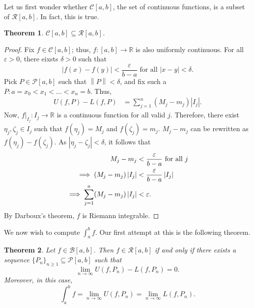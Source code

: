 \documentclass[15pt,a4paper]{book}
\newtheorem{theorem}{Theorem}[chapter]
\theoremstyle{definition}
\newcommand{\abs}[1]{\left| #1 \right|} %
\newcommand{\R}{\mathbb{R}} %
\newcommand{\cP}{\mathcal{P}}
\newcommand{\cR}{\mathcal{R}}
\newcommand{\cB}{\mathcal{B}}
\newcommand{\cC}{\mathcal{C}}
\newcommand{\norm}[1]{\left\lVert#1\right\rVert}
\begin{document}
Let us first wonder whether $\cC[a,b]$, the set of continuous functions, is a subset of $\cR[a,b]$. In fact, this is true.

\begin{theorem}
    $\cC[a,b] \subseteq \cR[a,b]$.
\end{theorem}
\begin{proof}
    Fix $f \in \cC[a,b]$; thus, $f:[a,b] \to \R$ is also uniformly continuous. For all $\varepsilon > 0$, there eixsts $\delta > 0$ such that
    \begin{equation}
        \abs{f(x)-f(y)} < \frac{\varepsilon}{b-a} \text{ for all } \abs{x-y} < \delta.
    \end{equation}
    Pick $P \in \cP[a,b]$ such that $\norm{P} < \delta$, and fix such a $P : a = x_{0} < x_{1} < \ldots < x_{n} = b$. Thus,
    \begin{align}
        U(f,P) - L(f,P) &= \sum_{j=1}^{n} (M_{j}-m_{j})\abs{I_{j}}.
    \end{align}
    Now, $f|_{I_{j}} : I_{j} \to \R$ is a continuous function for all valid $j$. Therefore, there exist $\eta_{j}, \zeta_{j} \in I_{j}$ such that $f(\eta_{j}) = M_{j}$ and $f(\zeta_{j}) = m_{j}$. $M_{j}-m_{j}$ can be rewritten as $f(\eta_{j}) - f(\zeta_{j})$. As $\abs{\eta_{j}-\zeta_{j}} < \delta$, it follows that
    \begin{align}
        M_{j}-m_{j} &< \frac{\varepsilon}{b-a} \text{ for all } j \\
        \implies (M_{j}-m_{j})\abs{I_{j}} &< \frac{\varepsilon}{b-a} \abs{I_{j}} \notag \\
        \implies \sum_{j=1}^{n} (M_{j}-m_{j}) \abs{I_{j}} &< \varepsilon.
    \end{align}
    By Darboux's theorem, $f$ is Riemann integrable.
\end{proof}
We now wish to compute $\int_{a}^{b} f$. Our first attempt at this is the following theorem.
\begin{theorem}
    Let $f \in \cB[a,b]$. Then $f \in \cR[a,b]$ if and only if there exists a sequence $\{P_{n}\}_{n \geq 1} \subseteq \cP[a,b]$ such that
    \begin{equation}
        \lim_{n \to \infty} U(f,P_{n}) - L(f,P_{n}) = 0.
    \end{equation}
    Moreover, in this case,
    \begin{equation}
        \int_{a}^{b} f = \lim_{n \to \infty} U(f,P_{n}) = \lim_{n \to \infty} L(f,P_{n}).
    \end{equation}
\end{theorem}
\end{document}

